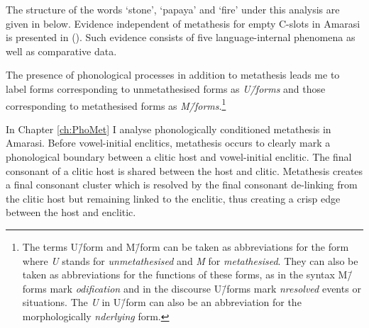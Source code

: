 The structure of the words  `stone',  `papaya' and  `fire'
under this analysis are given in  below.
Evidence independent of metathesis for empty C-slots in Amarasi 
is presented in ().
Such evidence consists of five language-internal
phenomena as well as comparative data.

\begin{multicols}{3}
	\begin{exe}
		\label{as:fatu/kaut/ai ch:Int}
	\end{exe}
\end{multicols}

The presence of phonological processes in addition to metathesis
leads me to label forms corresponding to unmetathesised forms as \emph{U\=/forms}
and those corresponding to metathesised forms as \emph{M\=/forms}.\footnote{
		The terms U\=/form and M\=/form can be taken as abbreviations for the form
		where \emph{U} stands for \emph{unmetathesised} and \emph{M} for \emph{metathesised}.
		They can also be taken as abbreviations for the functions of these forms,
		as in the syntax M\=/forms mark \emph{odification}
		and in the discourse U\=/forms mark \emph{nresolved} events or situations.
		The \emph{U} in U\=/form can also be an abbreviation for
		the morphologically \emph{nderlying} form.}

In Chapter \ref{ch:PhoMet} I analyse phonologically conditioned metathesis in Amarasi.
Before vowel-initial enclitics, metathesis occurs
to clearly mark a phonological boundary between
a clitic host and vowel-initial enclitic.
The final consonant of a clitic host is shared between the host and clitic.
Metathesis creates a final consonant cluster which is resolved
by the final consonant de-linking from the clitic host but remaining linked to the enclitic,
thus creating a crisp edge between the host and enclitic.

